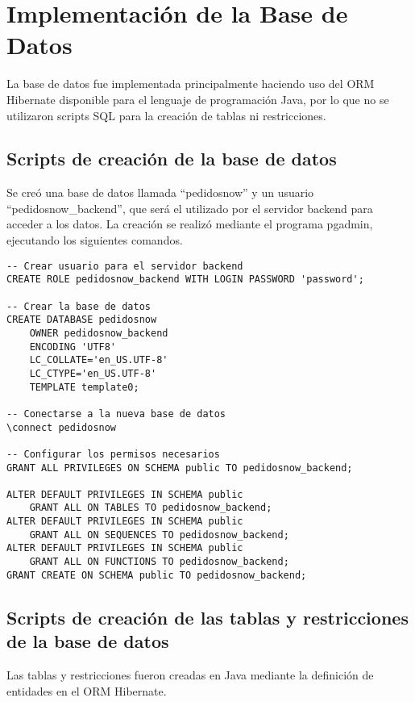 \section{Implementación de la Base de Datos}

La base de datos fue implementada principalmente haciendo uso del ORM Hibernate disponible para el lenguaje de programación Java, por lo que no se utilizaron scripts SQL para la creación de tablas ni restricciones.

\subsection{Scripts de creación de la base de datos}

Se creó una base de datos llamada ``pedidosnow'' y un usuario ``pedidosnow\_backend'', que será el utilizado por el servidor backend para acceder a los datos. La creación se realizó mediante el programa pgadmin, ejecutando los siguientes comandos.

\begin{lstlisting}[style=common, language=PostgreSQL]
-- Crear usuario para el servidor backend
CREATE ROLE pedidosnow_backend WITH LOGIN PASSWORD 'password';

-- Crear la base de datos
CREATE DATABASE pedidosnow
    OWNER pedidosnow_backend
    ENCODING 'UTF8'
    LC_COLLATE='en_US.UTF-8'
    LC_CTYPE='en_US.UTF-8'
    TEMPLATE template0;

-- Conectarse a la nueva base de datos
\connect pedidosnow

-- Configurar los permisos necesarios
GRANT ALL PRIVILEGES ON SCHEMA public TO pedidosnow_backend;

ALTER DEFAULT PRIVILEGES IN SCHEMA public
    GRANT ALL ON TABLES TO pedidosnow_backend;
ALTER DEFAULT PRIVILEGES IN SCHEMA public
    GRANT ALL ON SEQUENCES TO pedidosnow_backend;
ALTER DEFAULT PRIVILEGES IN SCHEMA public
    GRANT ALL ON FUNCTIONS TO pedidosnow_backend;
GRANT CREATE ON SCHEMA public TO pedidosnow_backend;
\end{lstlisting}

\subsection{Scripts de creación de las tablas y restricciones de la base de datos}

Las tablas y restricciones fueron creadas en Java mediante la definición de entidades en el ORM Hibernate.

